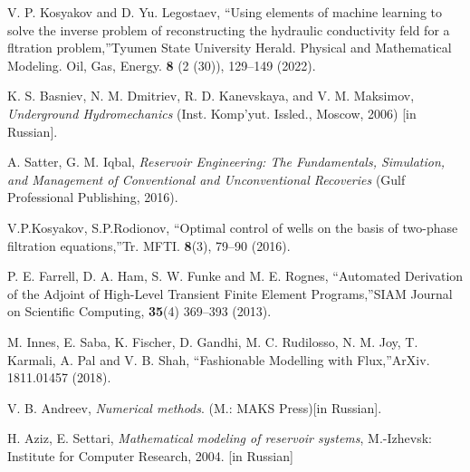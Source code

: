 \documentclass[
11pt,%
tightenlines,%
twoside,%
onecolumn,%
nofloats,%
nobibnotes,%
nofootinbib,%
superscriptaddress,%
noshowpacs,%
centertags]%
{revtex4}
\begin{document}
\begin{thebibliography}{99}
V. P. Kosyakov and D. Yu. Legostaev, \textquotedblleft Using elements of machine learning to solve the inverse problem of reconstructing the hydraulic conductivity feld for a fltration problem,\textquotedblright Tyumen State University Herald. Physical and Mathematical Modeling. Oil, Gas, Energy. {\bf 8} (2 (30)), 129--149 (2022).

K. S. Basniev, N. M. Dmitriev, R. D. Kanevskaya, and V. M. Maksimov, \textit{Underground Hydromechanics} (Inst. Komp'yut. Issled., Moscow, 2006) [in Russian].

A. Satter, G. M. Iqbal, \textit{Reservoir Engineering: The Fundamentals, Simulation, and Management of Conventional and Unconventional Recoveries} (Gulf Professional Publishing, 2016).

V.P.Kosyakov, S.P.Rodionov, \textquotedblleft Optimal control of wells on the basis of two-phase filtration equations,\textquotedblright Tr. MFTI. {\bf 8}(3), 79--90 (2016).

P. E. Farrell, D. A. Ham, S. W. Funke and M. E. Rognes, \textquotedblleft Automated Derivation of the Adjoint of High-Level Transient Finite Element Programs,\textquotedblright SIAM Journal on Scientific Computing, {\bf 35}(4) 369--393 (2013).

M. Innes, E. Saba, K. Fischer, D. Gandhi, M. C. Rudilosso, N. M. Joy, T. Karmali, A. Pal and V. B. Shah, \textquotedblleft Fashionable Modelling with Flux,\textquotedblright ArXiv. 1811.01457 (2018).

 V. B. Andreev, \textit{Numerical methods}. (M.: MAKS Press)[in Russian].

 H. Aziz, E. Settari, \textit{Mathematical modeling of reservoir systems},  M.-Izhevsk: Institute for Computer Research, 2004. [in Russian]

\end{thebibliography}
\end{document}
